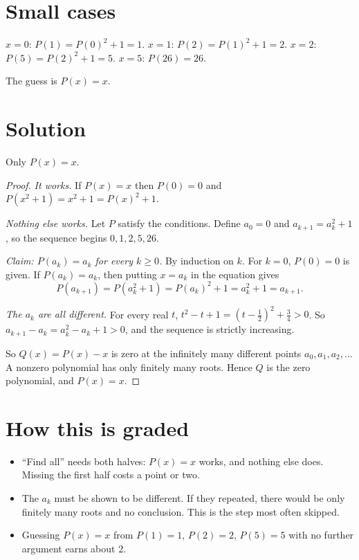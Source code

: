 \documentclass[11pt]{article}
\begin{document}
\section*{Small cases}
$x = 0$: $P(1) = P(0)^2 + 1 = 1$. \quad $x = 1$: $P(2) = P(1)^2 + 1 = 2$. \quad $x = 2$: $P(5) = P(2)^2 + 1 = 5$. \quad $x = 5$: $P(26) = 26$.

The guess is $P(x) = x$.

\section*{Solution}
\begin{answer}
Only $P(x) = x$.
\end{answer}
\begin{proof}
\emph{It works.} If $P(x) = x$ then $P(0) = 0$ and $P(x^2 + 1) = x^2 + 1 = P(x)^2 + 1$.

\emph{Nothing else works.} Let $P$ satisfy the conditions. Define $a_0 = 0$ and $a_{k+1} = a_k^2 + 1$, so the sequence begins $0, 1, 2, 5, 26$.

\emph{Claim: $P(a_k) = a_k$ for every $k \ge 0$.} By induction on $k$. For $k = 0$, $P(0) = 0$ is given. If $P(a_k) = a_k$, then putting $x = a_k$ in the equation gives
\[ P(a_{k+1}) = P(a_k^2 + 1) = P(a_k)^2 + 1 = a_k^2 + 1 = a_{k+1}. \]

\emph{The $a_k$ are all different.} For every real $t$, $t^2 - t + 1 = \left(t - \tfrac12\right)^2 + \tfrac34 > 0$. So $a_{k+1} - a_k = a_k^2 - a_k + 1 > 0$, and the sequence is strictly increasing.

So $Q(x) = P(x) - x$ is zero at the infinitely many different points $a_0, a_1, a_2, \dots$ A nonzero polynomial has only finitely many roots. Hence $Q$ is the zero polynomial, and $P(x) = x$.
\end{proof}

\section*{How this is graded}
\begin{itemize}
  \item ``Find all'' needs both halves: $P(x) = x$ works, and nothing else does. Missing the first half costs a point or two.
  \item The $a_k$ must be shown to be different. If they repeated, there would be only finitely many roots and no conclusion. This is the step most often skipped.
  \item Guessing $P(x) = x$ from $P(1) = 1$, $P(2) = 2$, $P(5) = 5$ with no further argument earns about $2$.
\end{itemize}
\end{document}
